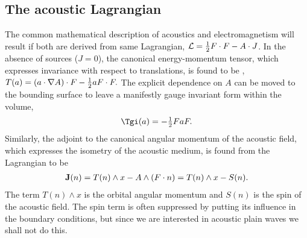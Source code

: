 \subsection{The acoustic Lagrangian}\label{sec:lagrangian}
The common mathematical  description of acoustics and electromagnetism will result if both are derived from same Lagrangian,
 $ {\cal L} = \frac{1}{2} F \cdot F  - A \cdot J$.
In the absence of sources ($J = 0$),
the canonical energy-momentum tensor, which expresses invariance with respect to translations,
is found to be \cite{Lasenby1993, Doran2003},  $T(a) = \left( a\cdot \nabla A \right)\cdot F - \tfrac{1}{2} a F \cdot F.$
The explicit dependence on $A$ can be moved to the bounding surface \cite{Lasenby1993}
to leave a manifestly gauge invariant form within the volume,
\begin{align}
\label{eqn:TAEM}
  \Tgi(a) = -\half F a F.
\end{align}
Similarly, the  adjoint to the canonical angular momentum of the acoustic field, which expresses the isometry of the acoustic medium, 
is found from the Lagrangian to be \cite{Lasenby1993}
\begin{align}
  \label{eqn:AM}
  \mathbf{J}(n) = T(n) \wedge x - A \wedge \left( F\cdot n \right) = T(n) \wedge x - S(n).
\end{align}
The term $T(n) \wedge x$ is the  orbital angular momentum and $S(n)$ is the spin of the acoustic field.
The spin term is often suppressed by putting its influence in the boundary conditions,
but since we are interested in acoustic plain waves we shall not do this.

